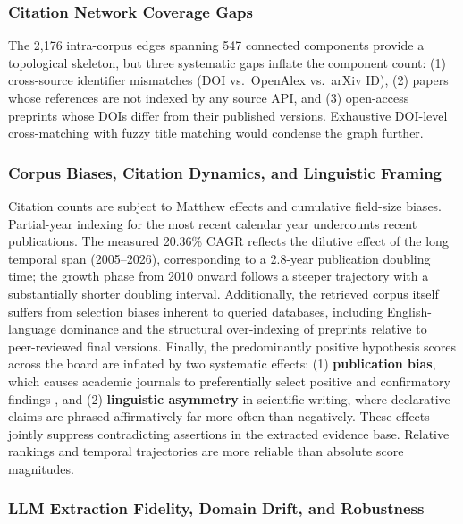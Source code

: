 \documentclass[
  english,
]{article}
\begin{document}
{{{{{{{{{{{{{{{{\subsubsection{Citation Network Coverage
Gaps}\label{citation-network-coverage-gaps}

The 2,176 intra-corpus edges spanning 547 connected components provide a
topological skeleton, but three systematic gaps inflate the component
count: (1) cross-source identifier mismatches (DOI vs.~OpenAlex
vs.~arXiv ID), (2) papers whose references are not indexed by any source
API, and (3) open-access preprints whose DOIs differ from their
published versions. Exhaustive DOI-level cross-matching with fuzzy title
matching would condense the graph further.

\subsubsection{Corpus Biases, Citation Dynamics, and Linguistic
Framing}\label{corpus-biases-citation-dynamics-and-linguistic-framing}

Citation counts are subject to Matthew effects and cumulative field-size
biases. Partial-year indexing for the most recent calendar year
undercounts recent publications. The measured 20.36\% CAGR reflects the
dilutive effect of the long temporal span (2005--2026), corresponding to
a 2.8-year publication doubling time; the growth phase from 2010 onward
follows a steeper trajectory with a substantially shorter doubling
interval. Additionally, the retrieved corpus itself suffers from
selection biases inherent to queried databases, including
English-language dominance and the structural over-indexing of preprints
relative to peer-reviewed final versions. Finally, the predominantly
positive hypothesis scores across the board are inflated by two
systematic effects: (1) \textbf{publication bias}, which causes academic
journals to preferentially select positive and confirmatory findings
\citep{sterling1959publication}, and (2) \textbf{linguistic asymmetry}
in scientific writing, where declarative claims are phrased
affirmatively far more often than negatively. These effects jointly
suppress contradicting assertions in the extracted evidence base.
Relative rankings and temporal trajectories are more reliable than
absolute score magnitudes.

\subsubsection{LLM Extraction Fidelity, Domain Drift, and
Robustness}\label{llm-extraction-fidelity-domain-drift-and-robustness}

}}}}}}}}}}}}}}}}
\end{document}
